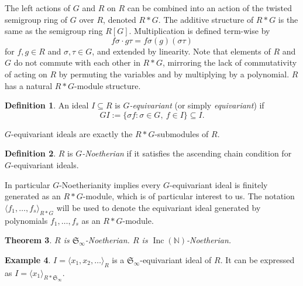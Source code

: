\documentclass{amsart}
\newtheorem{theorem}{Theorem}[section]
\theoremstyle{definition}
\newtheorem{definition}[theorem]{Definition}
\newtheorem{example}[theorem]{Example}
\theoremstyle{remark}
\numberwithin{equation}{section}
\newcommand{\B}[1]{\mathbb #1}
\newcommand{\F}[1]{\mathfrak #1}
\newcommand{\<}{\langle}
\renewcommand{\>}{\rangle}
\newcommand{\ideal}[1]{\langle #1 \rangle}
\newcommand{\Inc}{\operatorname{Inc}(\B N)}
\begin{document}
The left actions of $G$ and $R$ on $R$ can be combined into an action of the twisted semigroup ring of $G$ over $R$, denoted $R*G$.  The additive structure of $R*G$ is the same as the semigroup ring $R[G]$.  Multiplication is defined term-wise by 
 \[ f\sigma\cdot g\tau = f\sigma(g)(\sigma\tau) \]
for $f,g\in R$ and $\sigma,\tau\in G$, and extended by linearity.  Note that elements of $R$ and $G$ do not commute with each other in $R*G$, mirroring the lack of commutativity of acting on $R$ by permuting the variables and by multiplying by a polynomial.  $R$ has a natural $R*G$-module structure.

\begin{definition}
 An ideal $I \subseteq R$ is $G$\textit{-equivariant}
(or simply \textit{equivariant}) if \[ GI := \{\sigma f
: \sigma \in G, \ f \in I\} \subseteq I.\]
\end{definition}
$G$-equivariant ideals are exactly the $R*G$-submodules of $R$.

\begin{definition}
$R$ is $G${\em -Noetherian} if it satisfies the ascending chain condition for $G$-equivariant ideals. 
\end{definition}
In particular $G$-Noetherianity implies every $G$-equivariant ideal is finitely generated as an $R*G$-module, which is of particular interest to us.  The notation $\ideal{f_1,\ldots,f_s}_{R*G}$ will be used to denote the equivariant ideal generated by polynomials $f_1,\ldots,f_s$ as an $R*G$-module.

\begin{theorem}\label{onevarfinitegenthm}
$R$ is $\F S_\infty$-Noetherian.  $R$ is $\Inc$-Noetherian.
\end{theorem}

\begin{example}
$I = \<x_1,x_2,\ldots\>_R$ is a $\F S_\infty$-equivariant ideal of $R$.  It can be expressed as $I= \<x_1\>_{R*\F S_\infty}$.
\end{example}
\end{document}
